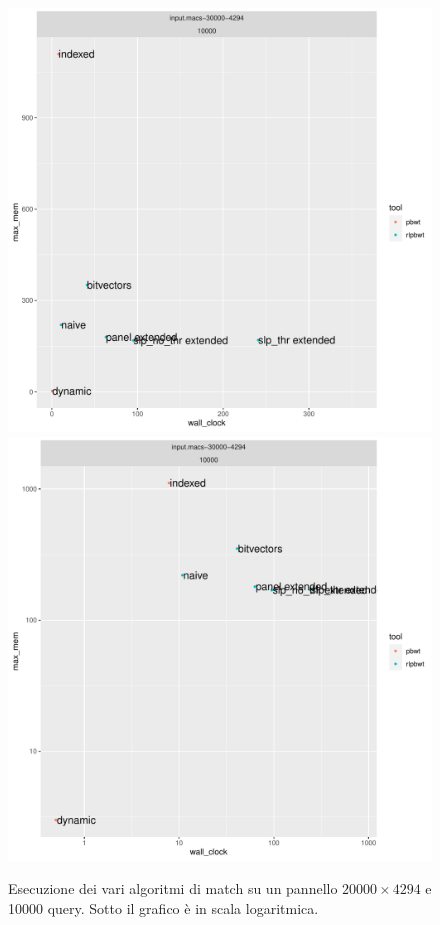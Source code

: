 \begin{figure}
  \centering
  \includegraphics[scale = 0.5]{img/time_vs_mem_10000.pdf}
  \includegraphics[scale = 0.5]{img/time_vs_mem-loglog_10000.pdf}
  \caption{Esecuzione dei vari algoritmi di match su un pannello
    $20000\times 4294$ e 10000 query. Sotto il grafico è in scala
    logaritmica. }
  \label{fig:10000}
\end{figure}

